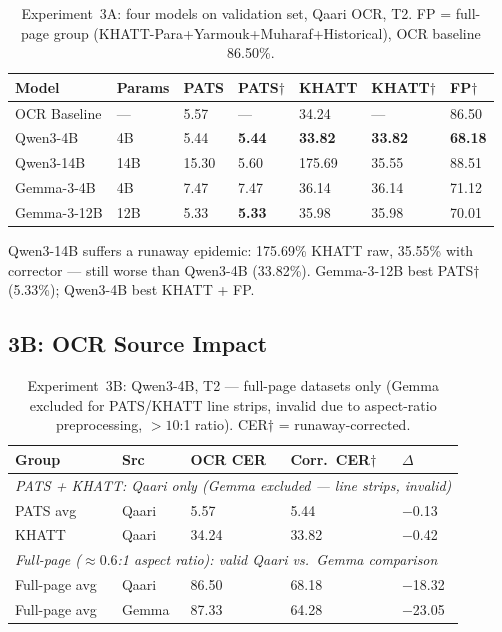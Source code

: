 \begin{table}[htbp]
  \centering
  \caption{Experiment~3A: four models on validation set, Qaari OCR, T2.
           FP = full-page group (KHATT-Para+Yarmouk+Muharaf+Historical),
           OCR baseline 86.50\%.}
  \label{tab:exp3_models}
  \begin{tabularx}{\textwidth}{llXXXXX}
    \toprule
    \textbf{Model} & \textbf{Params} & \textbf{PATS} & \textbf{PATS$\dagger$}
      & \textbf{KHATT} & \textbf{KHATT$\dagger$} & \textbf{FP$\dagger$} \\
    \midrule
    OCR Baseline & --- &  5.57 & ---   & 34.24 & ---   & 86.50 \\
    Qwen3-4B     & 4B  &  5.44 & \textbf{5.44} & \textbf{33.82} & \textbf{33.82} & \textbf{68.18} \\
    Qwen3-14B    & 14B & 15.30 & 5.60  & 175.69 & 35.55 & 88.51 \\
    Gemma-3-4B   & 4B  &  7.47 & 7.47  & 36.14 & 36.14 & 71.12 \\
    Gemma-3-12B  & 12B &  5.33 & \textbf{5.33} & 35.98 & 35.98 & 70.01 \\
    \bottomrule
  \end{tabularx}
\end{table}

Qwen3-14B suffers a runaway epidemic: 175.69\% KHATT raw, 35.55\% with
corrector --- still worse than Qwen3-4B (33.82\%). Gemma-3-12B best
PATS$\dagger$ (5.33\%); Qwen3-4B best KHATT + FP.

\subsection{3B: OCR Source Impact}
\label{subsec:res_exp3_ocr}

\begin{table}[htbp]
  \centering
  \caption{Experiment~3B: Qwen3-4B, T2 --- full-page datasets only (Gemma
           excluded for PATS/KHATT line strips, invalid due to aspect-ratio
           preprocessing, $>10$:1 ratio).
           CER$\dagger$ = runaway-corrected.}
  \label{tab:exp3_ocr_source}
  \begin{tabularx}{\textwidth}{llXXX}
    \toprule
    \textbf{Group} & \textbf{Src} & \textbf{OCR CER} & \textbf{Corr.\ CER$\dagger$} & \textbf{$\Delta$} \\
    \midrule
    \multicolumn{5}{l}{\textit{PATS + KHATT: Qaari only (Gemma excluded --- line strips, invalid)}} \\
    PATS avg & Qaari &  5.57 &  5.44 & $-$0.13 \\
    KHATT    & Qaari & 34.24 & 33.82 & $-$0.42 \\
    \midrule
    \multicolumn{5}{l}{\textit{Full-page ($\approx 0.6$:1 aspect ratio): valid Qaari vs.\ Gemma comparison}} \\
    Full-page avg & Qaari & 86.50 & 68.18 & $-$18.32 \\
    Full-page avg & Gemma & 87.33 & 64.28 & $-$23.05 \\
    \bottomrule
  \end{tabularx}
\end{table}

